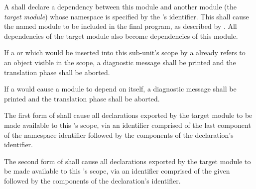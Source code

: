 
\specsubitem
A  shall declare a dependency between this module and
another module (the \textit{target module}) whose namespace is specified by the
's identifier. This shall cause the named module to
be included in the final program, as described by .
All dependencies of the target module also become dependencies of this module.

\specsubitem
If a  or  which would be inserted into
this sub-unit's scope by a  already refers to an
object visible in the scope, a diagnostic message shall be printed and the
translation phase shall be aborted.

\specsubitem
If a  would cause a module to depend on itself, a
diagnostic message shall be printed and the translation phase shall be aborted.

\specsubitem
The first form of  shall cause all declarations
exported by the target module to be made available to this
's scope, via an identifier comprised of the last
component of the namespace identifier followed by the components of the
declaration's identifier.


\specsubitem
The second form of  shall cause all declarations
exported by the target module to be made available to this
's scope, via an identifier comprised of the given
 followed by the components of the declaration's identifier.


